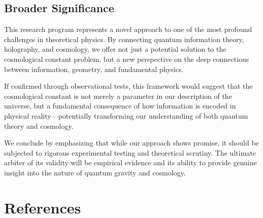 \documentclass[12pt]{article}
\theoremstyle{plain}
\theoremstyle{definition}
\theoremstyle{remark}
\begin{document}
\subsection{Broader Significance}

This research program represents a novel approach to one of the most profound challenges in theoretical physics. By connecting quantum information theory, holography, and cosmology, we offer not just a potential solution to the cosmological constant problem, but a new perspective on the deep connections between information, geometry, and fundamental physics.

If confirmed through observational tests, this framework would suggest that the cosmological constant is not merely a parameter in our description of the universe, but a fundamental consequence of how information is encoded in physical reality—potentially transforming our understanding of both quantum theory and cosmology.

We conclude by emphasizing that while our approach shows promise, it should be subjected to rigorous experimental testing and theoretical scrutiny. The ultimate arbiter of its validity will be empirical evidence and its ability to provide genuine insight into the nature of quantum gravity and cosmology.

\section*{References}
\end{document}
